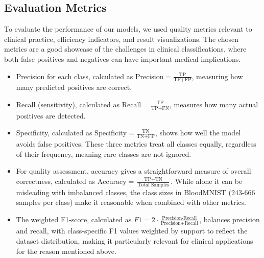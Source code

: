 \documentclass[runningheads]{llncs}
\begin{document}
\subsection{Evaluation Metrics}
To evaluate the performance of our models, we used quality metrics relevant to clinical practice, efficiency indicators, and result visualizations. 
The chosen metrics are a good showcase of the challenges in clinical classifications, where both false positives and negatives can have important medical implications.

\begin{itemize}
    \item Precision for each class, calculated as $\text{Precision} = \frac{\text{TP}}{\text{TP} + \text{FP}}$, measuring how many predicted positives are correct. 
    \item Recall (sensitivity), calculated as $\text{Recall} = \frac{\text{TP}}{\text{TP} + \text{FN}}$, measures how many actual positives are detected. 
    \item Specificity, calculated as $\text{Specificity} = \frac{\text{TN}}{\text{TN} + \text{FP}}$, shows how well the model avoids false positives. 
    These three metrics treat all classes equally, regardless of their frequency, meaning rare classes are not ignored.
    \item For quality assessment, accuracy gives a straightforward measure of overall correctness, calculated as $\text{Accuracy} = \frac{\text{TP} + \text{TN}}{\text{Total Samples}}$. 
    While alone it can be misleading with imbalanced classes, the class sizes in BloodMNIST (243-666 samples per class) make it reasonable when combined with other metrics. 
    \item The weighted F1-score, calculated as $F1 = 2 \cdot \frac{\text{Precision} \cdot \text{Recall}}{\text{Precision} + \text{Recall}}$, balances precision and recall, with class-specific F1 values weighted by support to reflect the dataset distribution, making it particularly relevant for clinical applications for the reason mentioned above.
\end{itemize}
\end{document}
